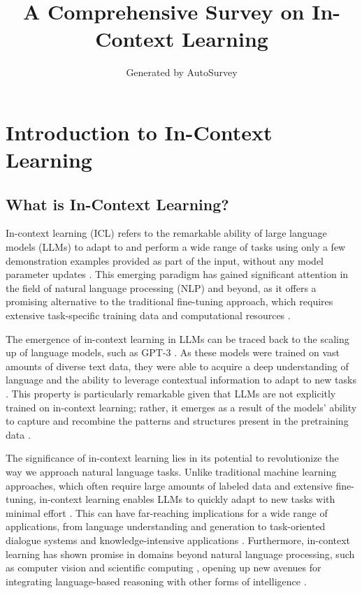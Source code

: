 \documentclass[11pt]{article}
\title{A Comprehensive Survey on In-Context Learning}
\author{Generated by AutoSurvey}
\date{}
\begin{document}
\maketitle
\tableofcontents
\newpage

\section{Introduction to In-Context Learning}

\subsection{What is In-Context Learning?}

In-context learning (ICL) refers to the remarkable ability of large language models (LLMs) to adapt to and perform a wide range of tasks using only a few demonstration examples provided as part of the input, without any model parameter updates \cite{ref1,ref2}. This emerging paradigm has gained significant attention in the field of natural language processing (NLP) and beyond, as it offers a promising alternative to the traditional fine-tuning approach, which requires extensive task-specific training data and computational resources \cite{ref3}.

The emergence of in-context learning in LLMs can be traced back to the scaling up of language models, such as GPT-3 \cite{ref4}. As these models were trained on vast amounts of diverse text data, they were able to acquire a deep understanding of language and the ability to leverage contextual information to adapt to new tasks \cite{ref5}. This property is particularly remarkable given that LLMs are not explicitly trained on in-context learning; rather, it emerges as a result of the models' ability to capture and recombine the patterns and structures present in the pretraining data \cite{ref6}.

The significance of in-context learning lies in its potential to revolutionize the way we approach natural language tasks. Unlike traditional machine learning approaches, which often require large amounts of labeled data and extensive fine-tuning, in-context learning enables LLMs to quickly adapt to new tasks with minimal effort \cite{ref7}. This can have far-reaching implications for a wide range of applications, from language understanding and generation to task-oriented dialogue systems and knowledge-intensive applications \cite{ref8}. Furthermore, in-context learning has shown promise in domains beyond natural language processing, such as computer vision and scientific computing \cite{ref9,ref10}, opening up new avenues for integrating language-based reasoning with other forms of intelligence \cite{ref11,ref12}.
\end{document}
